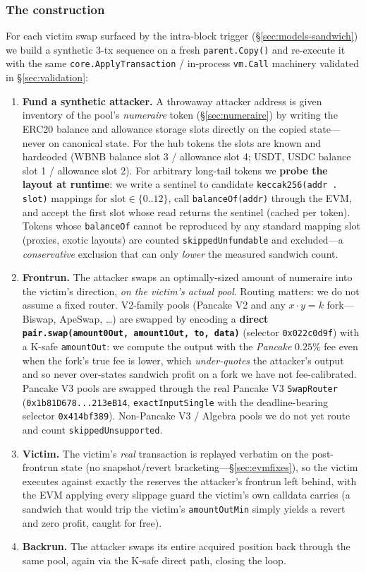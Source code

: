 \documentclass[11pt]{article}
\newcommand{\code}[1]{\texttt{#1}}
\begin{document}
\subsubsection{The construction}
For each victim swap surfaced by the intra-block trigger (\S\ref{sec:models-sandwich})
we build a synthetic 3-tx sequence on a fresh \code{parent.Copy()} and re-execute it
with the same \code{core.ApplyTransaction} / in-process \code{vm.Call} machinery
validated in \S\ref{sec:validation}:
\begin{enumerate}
  \item \textbf{Fund a synthetic attacker.} A throwaway attacker address is given
    inventory of the pool's \emph{numeraire} token (\S\ref{sec:numeraire}) by writing
    the ERC20 balance and allowance storage slots directly on the copied
    state---never on canonical state. For the hub tokens the slots are known and
    hardcoded (WBNB balance slot 3 / allowance slot 4; USDT, USDC balance slot 1 /
    allowance slot 2). For arbitrary long-tail tokens we \textbf{probe the layout at
    runtime}: we write a sentinel to candidate \code{keccak256(addr . slot)} mappings
    for $\text{slot}\in\{0..12\}$, call \code{balanceOf(addr)} through the EVM, and
    accept the first slot whose read returns the sentinel (cached per token). Tokens
    whose \code{balanceOf} cannot be reproduced by any standard mapping slot
    (proxies, exotic layouts) are counted \code{skippedUnfundable} and excluded---a
    \emph{conservative} exclusion that can only \emph{lower} the measured sandwich
    count.
  \item \textbf{Frontrun.} The attacker swaps an optimally-sized amount of numeraire
    into the victim's direction, \emph{on the victim's actual pool}. Routing matters:
    we do not assume a fixed router. V2-family pools (Pancake V2 and any $x\cdot y=k$
    fork---Biswap, ApeSwap, \dots) are swapped by encoding a \textbf{direct
    \code{pair.swap(amount0Out, amount1Out, to, data)}} (selector \code{0x022c0d9f})
    with a K-safe \code{amountOut}: we compute the output with the \emph{Pancake}
    $0.25\%$ fee even when the fork's true fee is lower, which \emph{under-quotes} the
    attacker's output and so never over-states sandwich profit on a fork we have not
    fee-calibrated. Pancake V3 pools are swapped through the real Pancake V3
    \code{SwapRouter} (\code{0x1b81D678...213eB14}, \code{exactInputSingle} with the
    deadline-bearing selector \code{0x414bf389}). Non-Pancake V3 / Algebra pools we do
    not yet route and count \code{skippedUnsupported}.
  \item \textbf{Victim.} The victim's \emph{real} transaction is replayed verbatim on
    the post-frontrun state (no snapshot/revert bracketing---\S\ref{sec:evmfixes}), so
    the victim executes against exactly the reserves the attacker's frontrun left
    behind, with the EVM applying every slippage guard the victim's own calldata
    carries (a sandwich that would trip the victim's \code{amountOutMin} simply yields
    a revert and zero profit, caught for free).
  \item \textbf{Backrun.} The attacker swaps its entire acquired position back through
    the same pool, again via the K-safe direct path, closing the loop.
\end{enumerate}
\end{document}
